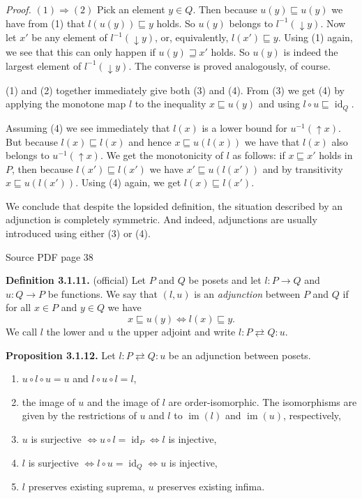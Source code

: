 \documentclass[11pt]{article}
\newcommand{\leanmarker}[2]{%
  \Needspace{3\baselineskip}%
  \marginnote{\hyperlink{#1}{\color{LeanTeal}\fbox{\scriptsize Lean}}}%
  \hypertarget{#1}{\textbf{#2.}}%
}
\newcommand{\sourcepage}[1]{\par\medskip\noindent\textcolor{SourceGray}{\scriptsize Source PDF page #1}\par\smallskip}
\begin{document}
\emph{Proof.} $(1)\Rightarrow(2)$ Pick an element $y\in Q$. Then because $u(y)\sqsubseteq u(y)$ we have from (1) that $l(u(y))\sqsubseteq y$ holds. So $u(y)$ belongs to $l^{-1}(\downarrow y)$. Now let $x'$ be any element of $l^{-1}(\downarrow y)$, or, equivalently, $l(x')\sqsubseteq y$. Using (1) again, we see that this can only happen if $u(y)\sqsupseteq x'$ holds. So $u(y)$ is indeed the largest element of $l^{-1}(\downarrow y)$. The converse is proved analogously, of course.

(1) and (2) together immediately give both (3) and (4). From (3) we get (4) by applying the monotone map $l$ to the inequality $x\sqsubseteq u(y)$ and using $l\circ u\sqsubseteq \operatorname{id}_Q$.

Assuming (4) we see immediately that $l(x)$ is a lower bound for $u^{-1}(\uparrow x)$. But because $l(x)\sqsubseteq l(x)$ and hence $x\sqsubseteq u(l(x))$ we have that $l(x)$ also belongs to $u^{-1}(\uparrow x)$. We get the monotonicity of $l$ as follows: if $x\sqsubseteq x'$ holds in $P$, then because $l(x')\sqsubseteq l(x')$ we have $x'\sqsubseteq u(l(x'))$ and by transitivity $x\sqsubseteq u(l(x'))$. Using (4) again, we get $l(x)\sqsubseteq l(x')$.

We conclude that despite the lopsided definition, the situation described by an adjunction is completely symmetric. And indeed, adjunctions are usually introduced using either (3) or (4).

\sourcepage{38}
\leanmarker{def-3-1-11}{Definition 3.1.11} (official) Let $P$ and $Q$ be posets and let $l:P\to Q$ and $u:Q\to P$ be functions. We say that $(l,u)$ is an \emph{adjunction} between $P$ and $Q$ if for all $x\in P$ and $y\in Q$ we have
\[
  x\sqsubseteq u(y) \Longleftrightarrow l(x)\sqsubseteq y.
\]
We call $l$ the lower and $u$ the upper adjoint and write $l:P\rightleftarrows Q:u$.

\leanmarker{prop-3-1-12}{Proposition 3.1.12} Let $l:P\rightleftarrows Q:u$ be an adjunction between posets.
\begin{enumerate}
\item $u\circ l\circ u=u$ and $l\circ u\circ l=l$,
\item the image of $u$ and the image of $l$ are order-isomorphic. The isomorphisms are given by the restrictions of $u$ and $l$ to $\operatorname{im}(l)$ and $\operatorname{im}(u)$, respectively,
\item $u$ is surjective $\Longleftrightarrow u\circ l=\operatorname{id}_P \Longleftrightarrow l$ is injective,
\item $l$ is surjective $\Longleftrightarrow l\circ u=\operatorname{id}_Q \Longleftrightarrow u$ is injective,
\item $l$ preserves existing suprema, $u$ preserves existing infima.
\end{enumerate}
\end{document}
